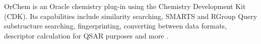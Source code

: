 OrChem is an Oracle chemistry plug-in using the Chemistry Development Kit (CDK). Its capabilities include similarity searching, SMARTS and RGroup Query substructure searching, fingerprinting, converting between data formats, descriptor calculation for QSAR purposes and more \cite{Rijnbeek_2009}.